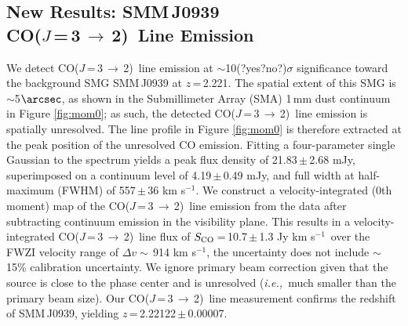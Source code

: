 \documentclass[twocolumn,apj,numberedappendix]{emulateapj}
\newcommand{\CO}{\mbox{CO($J$\,=\,3\,$\rightarrow$\,2) }}
\newcommand{\ie}{{\sl i.e.,~}}
\newcommand{\pmOne}{\mbox{$^{-1}$}}
\begin{document}
\subsection{New Results: SMM\,J0939\\ \CO Line Emission}
We detect \CO line emission at $\sim$10(?yes?no?)$\sigma$ significance toward the background SMG SMM\,J0939 at $z$\,=\,2.221.
The spatial extent of this SMG is $\sim$5$\arcsec$, as shown in the Submillimeter Array (SMA) 1\,mm dust continuum in Figure \ref{fig:mom0}; as such, the detected \CO line emission is spatially unresolved. 
The line profile in Figure \ref{fig:mom0} is therefore extracted at the peak position of the unresolved CO emission. Fitting a four-parameter single Gaussian to the spectrum yields a peak flux density of 21.83\,$\pm$\,2.68\,\,mJy, superimposed on a continuum level of 4.19\,$\pm$\,0.49\,\,mJy, and full width at half-maximum (FWHM) of 557\,$\pm$\,36\,\,km\,\,s\pmOne. 
We construct a velocity-integrated (0th moment) map of the \CO line 
emission from the data after subtracting continuum emission in the visibility plane. This results in a velocity-integrated \CO line flux of $S_{\rm CO}$\,=\,10.7\,$\pm$\,1.3 Jy km\,\,s\pmOne\ over the FWZI velocity range of $\Delta v\sim$\,914 km\,\,s\pmOne, the uncertainty does not include $\sim$\,15\% calibration uncertainty. We ignore primary beam correction given that the source is close to the phase center and is unresolved (\ie much smaller than the primary beam size). Our \CO line measurement confirms the redshift of SMM\,J0939, yielding $z$\,=\,2.22122\,$\pm$\,0.00007.
\end{document}
